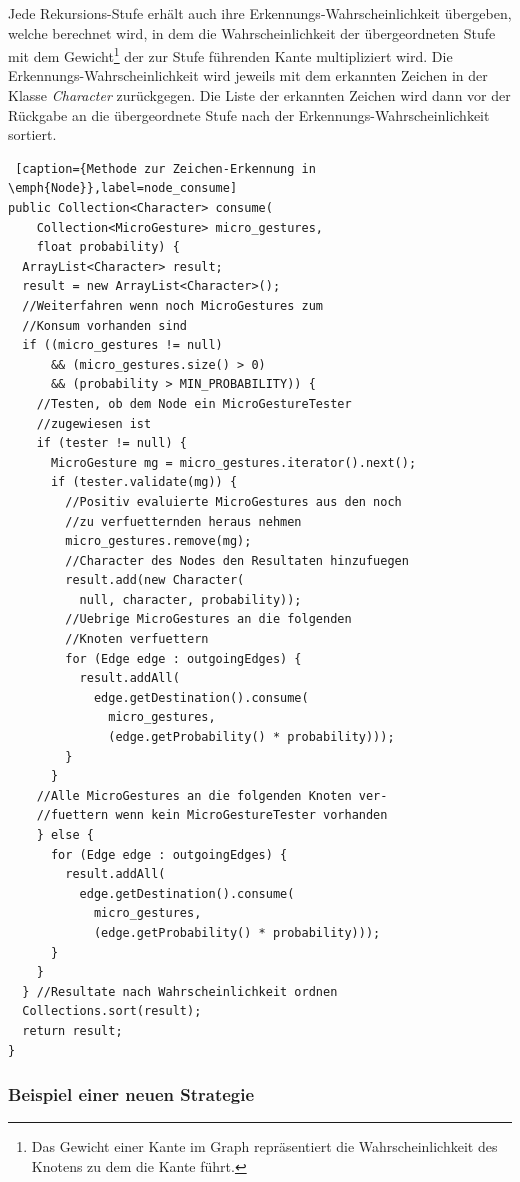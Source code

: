 Jede Rekursions-Stufe erhält auch ihre Erkennungs-Wahrscheinlichkeit übergeben, welche berechnet wird, in dem die Wahrscheinlichkeit der übergeordneten Stufe mit dem Gewicht\footnote{Das Gewicht einer Kante im Graph repräsentiert die Wahrscheinlichkeit des Knotens zu dem die Kante führt.} der zur Stufe führenden Kante multipliziert wird. Die Erkennungs-Wahrscheinlichkeit wird jeweils mit dem erkannten Zeichen in der Klasse \emph{Character} zurückgegen. Die Liste der erkannten Zeichen wird dann vor der Rückgabe an die übergeordnete Stufe nach der Erkennungs-Wahrscheinlichkeit sortiert.
\newpage
\begin{lstlisting} [caption={Methode zur Zeichen-Erkennung in \emph{Node}},label=node_consume]
public Collection<Character> consume(
    Collection<MicroGesture> micro_gestures, 
    float probability) {
  ArrayList<Character> result;
  result = new ArrayList<Character>();
  //Weiterfahren wenn noch MicroGestures zum 
  //Konsum vorhanden sind
  if ((micro_gestures != null) 
      && (micro_gestures.size() > 0) 
      && (probability > MIN_PROBABILITY)) {
    //Testen, ob dem Node ein MicroGestureTester 
    //zugewiesen ist
    if (tester != null) {
      MicroGesture mg = micro_gestures.iterator().next();
      if (tester.validate(mg)) {
        //Positiv evaluierte MicroGestures aus den noch 
        //zu verfuetternden heraus nehmen
        micro_gestures.remove(mg);
        //Character des Nodes den Resultaten hinzufuegen
        result.add(new Character(
          null, character, probability));
        //Uebrige MicroGestures an die folgenden 
        //Knoten verfuettern
        for (Edge edge : outgoingEdges) {
          result.addAll(
            edge.getDestination().consume(
              micro_gestures, 
              (edge.getProbability() * probability)));
        }
      }
    //Alle MicroGestures an die folgenden Knoten ver-
    //fuettern wenn kein MicroGestureTester vorhanden
    } else {
      for (Edge edge : outgoingEdges) {
        result.addAll(
          edge.getDestination().consume(
            micro_gestures, 
            (edge.getProbability() * probability)));
      }
    }
  } //Resultate nach Wahrscheinlichkeit ordnen
  Collections.sort(result);
  return result;
}
\end{lstlisting}


\subsubsection{Beispiel einer neuen Strategie}


